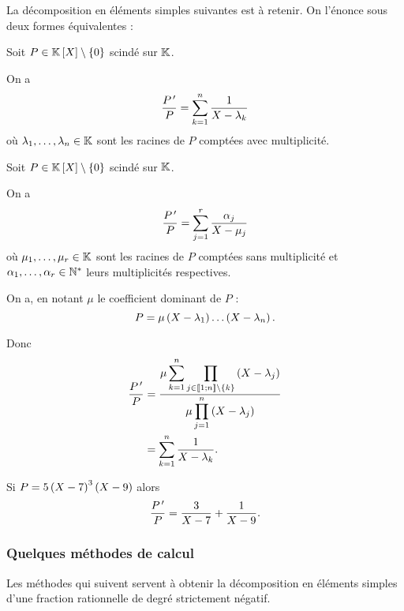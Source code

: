 \begin{rem}
La décomposition en éléments simples suivantes est à retenir. On l'énonce sous deux formes équivalentes :
\end{rem}

\begin{prop}
Soit \(P\in\poly\excluant\accol{0}\) scindé sur \(\mathbb{K}\).

On a \[\dfrac{P^{\,\prime}}{P}=\sum_{k=1}^n\dfrac{1}{X-\lambda_k}\] où \(\lambda_1,\dots,\lambda_n\in\mathbb{K}\) sont les racines de \(P\) comptées avec multiplicité.
\end{prop}

\begin{prop}
Soit \(P\in\poly\excluant\accol{0}\) scindé sur \(\mathbb{K}\).

On a \[\dfrac{P^{\,\prime}}{P}=\sum_{j=1}^r\dfrac{\alpha_j}{X-\mu_j}\] où \(\mu_1,\dots,\mu_r\in\mathbb{K}\) sont les racines de \(P\) comptées sans multiplicité et \(\alpha_1,\dots,\alpha_r\in\mathbb{N}^*\) leurs multiplicités respectives.
\end{prop}

\begin{dem}
On a, en notant \(\mu\) le coefficient dominant de \(P\) : \[P=\mu\left(X-\lambda_1\right)\dots\left(X-\lambda_n\right).\]

Donc \[\begin{aligned}
\dfrac{P^{\,\prime}}{P}&=\dfrac{\mu\displaystyle\sum_{k=1}^n\prod_{j\in\left\llbracket1;n\right\rrbracket\setminus\left\lbrace k\right\rbrace}\left(X-\lambda_j\right)}{\mu\displaystyle\prod_{j=1}^n\left(X-\lambda_j\right)} \\
&=\sum_{k=1}^n\dfrac{1}{X-\lambda_k}.
\end{aligned}\]
\end{dem}

\begin{ex}
Si \(P=5\left(X-7\right)^3\left(X-9\right)\) alors \[\dfrac{P^{\,\prime}}{P}=\dfrac{3}{X-7}+\dfrac{1}{X-9}.\]
\end{ex}

\subsubsection{Quelques méthodes de calcul}

\begin{rem}
Les méthodes qui suivent servent à obtenir la décomposition en éléments simples d'une fraction rationnelle de degré strictement négatif.
\end{rem}

